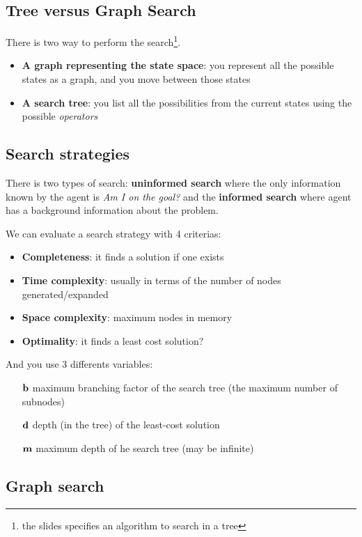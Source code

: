 \subsection{Tree versus Graph Search}

There is two way to perform the search\footnote{the slides specifies an algorithm to search in a tree}.
\begin{itemize}
\item \textbf{A graph representing the state space}: you represent all the possible states as a graph, and you move between those states
\item \textbf{A search tree}: you list all the possibilities from the current states using the possible \textit{operators}
\end{itemize}
\subsection{Search strategies}
There is two types of search: \textbf{uninformed search} where the only information known by the agent is \textit{Am I on the goal?} and the \textbf{informed search} where agent has a background information about the problem.

We can evaluate a search strategy with 4 criterias:
\begin{itemize}
\item \textbf{Completeness}: it finds a solution if one exists
\item \textbf{Time complexity}: usually in terms of the number of nodes generated/expanded
\item \textbf{Space complexity}: maximum nodes in memory
\item \textbf{Optimality}: it finds a least cost solution?
\end{itemize}
And you use 3 differents variables:
\begin{itemize}
\item[$\textbf b$] maximum branching factor of the search tree (the maximum number of subnodes)
\item[$\textbf d$] depth (in the tree) of the least-cost solution
\item[$\textbf m$] maximum depth of he search tree (may be infinite)
\end{itemize}

\subsection{Graph search}

